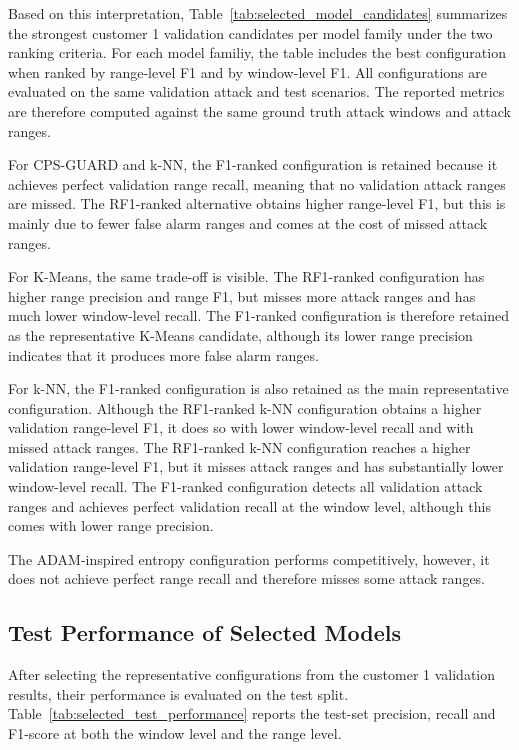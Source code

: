 Based on this interpretation, Table~\ref{tab:selected_model_candidates} summarizes the strongest customer 1 validation candidates per model family under the two ranking criteria. For each model familiy, the table includes the best configuration when ranked by range-level F1 and by window-level F1. All configurations are evaluated on the same validation attack and test scenarios. The reported metrics are therefore computed against the same ground truth attack windows and attack ranges. 

For CPS-GUARD and k-NN, the F1-ranked configuration is retained because it achieves perfect validation range recall, meaning that no validation attack ranges are missed. The RF1-ranked alternative obtains higher range-level F1, but this is mainly due to fewer false alarm ranges and comes at the cost of missed attack ranges. 

For K-Means, the same trade-off is visible. The RF1-ranked configuration has higher range precision and range F1, but misses more attack ranges and has much lower window-level recall. The F1-ranked configuration is therefore retained as the representative K-Means candidate, although its lower range precision indicates that it produces more false alarm ranges. 

For k-NN, the F1-ranked configuration is also retained as the main representative configuration. Although the RF1-ranked k-NN configuration obtains a higher validation range-level F1, it does so with lower window-level recall and with missed attack ranges. The RF1-ranked k-NN configuration reaches a higher validation range-level F1, but it misses attack ranges and has substantially lower window-level recall. The F1-ranked configuration detects all validation attack ranges and achieves perfect validation recall at the window level, although this comes with lower range precision.

The ADAM-inspired entropy configuration performs competitively, however, it does not achieve perfect range recall and therefore misses some attack ranges. 




\subsection{Test Performance of Selected Models}

After selecting the representative configurations from the customer 1 validation results,
their performance is evaluated on the test split. Table~\ref{tab:selected_test_performance}
reports the test-set precision, recall and F1-score at both the window level and
the range level.

